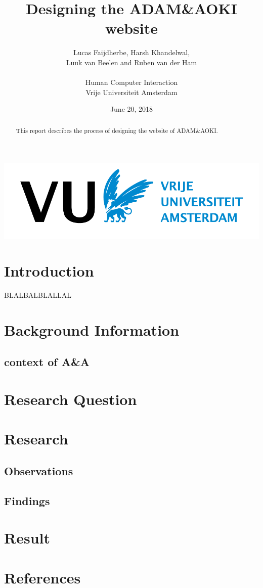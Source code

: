 \documentclass[a4paper,11pt]{article}
\title{Designing the ADAM\&AOKI website}
\date{June 20, 2018}
\author{Lucas Faijdherbe, Harsh Khandelwal, \\Luuk van Beelen and Ruben van der Ham\\\\
	\small Human Computer Interaction\\
	\small Vrije Universiteit Amsterdam}
\begin{document}
\begin{titlepage}

\centering
\maketitle
\includegraphics[width=0.8\linewidth]{images/vulogo.png}
\end{titlepage}
\clearpage



\tableofcontents
\clearpage
{} %

\begin{abstract}
This report describes the process of designing the website of ADAM\&AOKI.
\end{abstract}




\section{Introduction}
BLALBALBLALLAL

\section{Background Information}
\subsection{context of A\&A}






\section{Research Question}


\section{Research}
\subsection{Observations}
\subsection*{Findings}


\section{Result}




\section{References}



\end{document}
